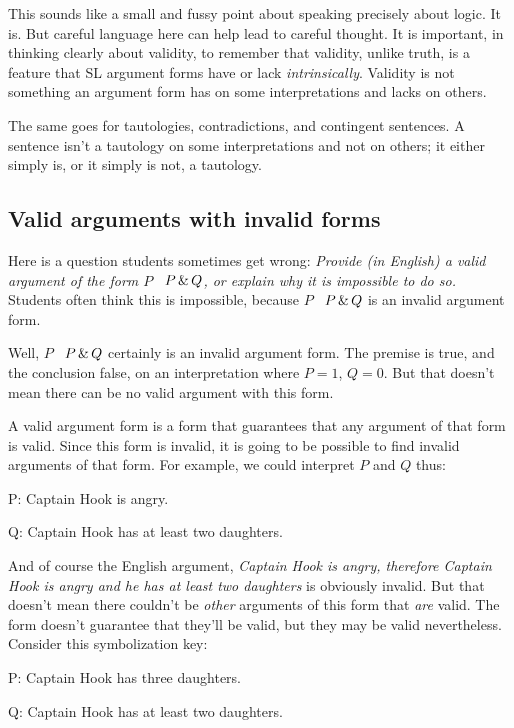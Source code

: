 This sounds like a small and fussy point about speaking precisely about logic. It is. But careful language here can help lead to careful thought. It is important, in thinking clearly about validity, to remember that validity, unlike truth, is a feature that SL argument forms have or lack \emph{intrinsically}. Validity is not something an argument form has on some interpretations and lacks on others.

The same goes for tautologies, contradictions, and contingent sentences. A sentence isn't a tautology on some interpretations and not on others; it either simply is, or it simply is not, a tautology.

\subsection{Valid arguments with invalid forms}

Here is a question students sometimes get wrong: \emph{Provide (in English) a valid argument of the form $P$ \therefore\ $P \,\&\, Q$, or explain why it is impossible to do so.} Students often think this is impossible, because $P$ \therefore\ $P \,\&\, Q$ is an invalid argument form.

Well,  $P$ \therefore\ $P \,\&\, Q$ certainly is an invalid argument form. The premise is true, and the conclusion false, on an interpretation where $P=1$, $Q=0$. But that doesn't mean there can be no valid argument with this form.

A valid argument form is a form that guarantees that any argument of that form is valid. Since this form is invalid, it is going to be possible to find invalid arguments of that form. For example, we could interpret $P$ and $Q$ thus:

\begin{ekey}
\item[P:] Captain Hook is angry.
\item[Q:] Captain Hook has at least two daughters.
\end{ekey}

And of course the English argument, \emph{Captain Hook is angry, therefore Captain Hook is angry and he has at least two daughters} is obviously invalid. But that doesn't mean there couldn't be \emph{other} arguments of this form that \emph{are} valid. The form doesn't guarantee that they'll be valid, but they may be valid nevertheless. Consider this symbolization key:

\begin{ekey}
\item[P:] Captain Hook has three daughters.
\item[Q:] Captain Hook has at least two daughters.
\end{ekey}

